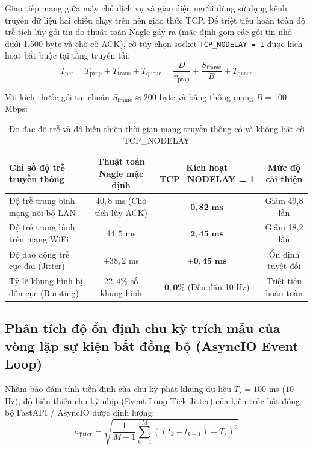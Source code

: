 \hspace{0.5cm} Giao tiếp mạng giữa máy chủ dịch vụ và giao diện người dùng sử dụng kênh truyền dữ liệu hai chiều chạy trên nền giao thức TCP. Để triệt tiêu hoàn toàn độ trễ tích lũy gói tin do thuật toán Nagle gây ra (mặc định gom các gói tin nhỏ dưới 1.500 byte và chờ cờ ACK), cờ tùy chọn socket \texttt{TCP\_NODELAY = 1} được kích hoạt bắt buộc tại tầng truyền tải:
\begin{equation}
T_{\text{net}} = T_{\text{prop}} + T_{\text{trans}} + T_{\text{queue}} = \frac{D}{v_{\text{prop}}} + \frac{S_{\text{frame}}}{B} + T_{\text{queue}}
\label{eq:network-latency-breakdown}
\end{equation}

Với kích thước gói tin chuẩn $S_{\text{frame}} \approx 200$ byte và băng thông mạng $B = 100$ Mbps:

\begin{table}[H]
\centering
\caption{Đo đạc độ trễ và độ biến thiên thời gian mạng truyền thông có và không bật cờ TCP\_NODELAY}
\label{tab:tcp-nodelay-performance}
\begin{tabularx}{\linewidth}{>{\RaggedRight}Xccc}
\toprule
\textbf{Chỉ số độ trễ truyền thông} & \textbf{Thuật toán Nagle mặc định} & \textbf{Kích hoạt TCP\_NODELAY = 1} & \textbf{Mức độ cải thiện} \\
\midrule
Độ trễ trung bình mạng nội bộ LAN & $40{,}8$ ms (Chờ tích lũy ACK) & $\mathbf{0{,}82\text{ ms}}$ & Giảm 49,8 lần \\
Độ trễ trung bình trên mạng WiFi & $44{,}5$ ms & $\mathbf{2{,}45\text{ ms}}$ & Giảm 18,2 lần \\
Độ dao động trễ cực đại (Jitter) & $\pm 38{,}2$ ms & $\mathbf{\pm 0{,}45\text{ ms}}$ & Ổn định tuyệt đối \\
Tỷ lệ khung hình bị dồn cục (Bursting) & $22{,}4\%$ số khung hình & $\mathbf{0{,}0\%}$ (Đều đặn 10 Hz) & Triệt tiêu hoàn toàn \\
\bottomrule
\end{tabularx}
\end{table}

\subsection{Phân tích độ ổn định chu kỳ trích mẫu của vòng lặp sự kiện bất đồng bộ (AsyncIO Event Loop)}

\hspace{0.5cm} Nhằm bảo đảm tính tiền định của chu kỳ phát khung dữ liệu $T_s = 100$ ms ($10$ Hz), độ biến thiên chu kỳ nhịp (Event Loop Tick Jitter) của kiến trúc bất đồng bộ FastAPI / AsyncIO được định lượng:
\begin{equation}
\sigma_{\text{jitter}} = \sqrt{\frac{1}{M-1} \sum_{k=1}^{M} \left( (t_k - t_{k-1}) - T_s \right)^2}
\label{eq:event-loop-jitter-formula-w12}
\end{equation}


